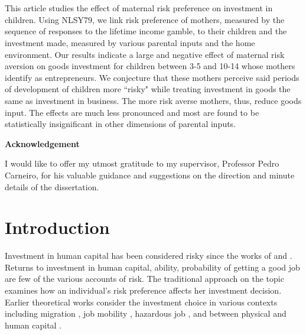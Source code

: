 \documentclass[emulatestandardclasses, 10pt, abstract = true]{scrartcl}
\makeatletter
\renewenvironment{abstract}{%
	\if@twocolumn
	\section*{\abstractname}%
	\else %
	\begin{center}%
		{\bfseries \large\abstractname\vspace{\z@}}%
	\end{center}%
	\quotation
	\fi}
{\if@twocolumn\else\endquotation\fi}
\makeatother
\begin{document}
\begin{titlingpage}
\paragraph*{\vspace{3cm}}
\begin{abstract}\large
	\noindent 
	This article studies the effect of maternal risk preference on investment in children. Using NLSY79, we link risk preference of mothers, measured by the sequence of responses to the lifetime income gamble, to their children and the investment made, measured by various parental inputs and the home environment. Our results indicate a large and negative effect of maternal risk aversion on goods investment for children between 3-5 and 10-14 whose mothers identify as entrepreneurs. We conjecture that these mothers perceive said periods of development of children more ``risky" while treating investment in goods the same as investment in business. The more risk averse mothers, thus, reduce goods input. The effects are much less pronounced and most are found to be statistically insignificant in other dimensions of parental inputs.
\end{abstract}

\vspace{5cm}
\begin{center}
	\begin{minipage}[!h]{.89\linewidth}\small
			\begin{center}
				\large	\textbf{Acknowledgement}
				\end{center} \large
			\noindent I would like to offer my utmost gratitude to my supervisor, Professor Pedro Carneiro, for his valuable guidance and suggestions on the direction and minute details of the dissertation.
		\end{minipage}
\end{center}

\end{titlingpage}


\section{Introduction}
Investment in human capital has been considered risky since the works of \citet{becker1962investment, levhari1974effect} and \citet{schultz1971investment}. Returns to investment in human capital, ability, probability of getting a good job are few of the various accounts of risk. The traditional approach on the topic examines how an individual's risk preference affects her investment decision. Earlier theoretical works consider the investment choice in various contexts including migration \citep{david1974fortune}, job mobility \citep{johnson1978theory}, hazardous job \citep{thaler1976value}, and between physical and human capital \citep{levhari1974effect}. 
\end{document}
